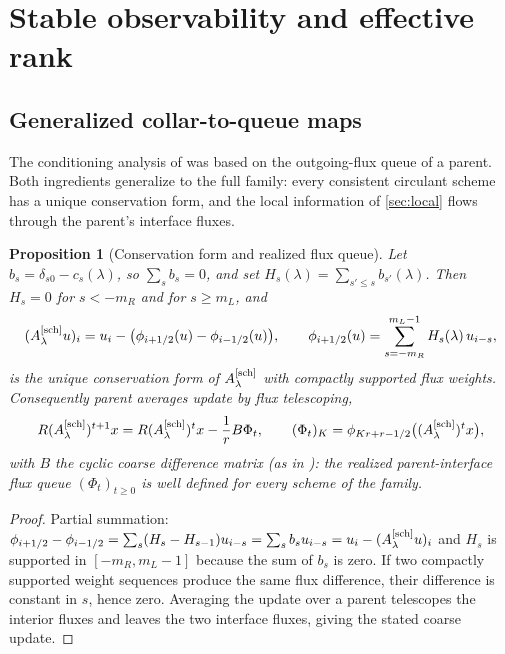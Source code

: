 \documentclass[pdflatex,sn-mathphys-num]{sn-jnl}%
\theoremstyle{thmstyleone}%
\newtheorem{proposition}{Proposition}%
\theoremstyle{thmstyletwo}%
\theoremstyle{thmstylethree}%
\newcommand{\Asch}{A^{[\rm sch]}_\lambda}
\begin{document}
\section{Stable observability and effective rank}\label{sec:conditioning}

\subsection{Generalized collar-to-queue maps}\label{sec:queue-maps}

The conditioning analysis of \cite{PolemitisChristakisDrikakis2026FVerasure} was based on the outgoing-flux queue of a parent.
Both ingredients generalize to the full family: every consistent circulant scheme has a unique conservation form, and the local information of \cref{sec:local} flows through the parent's interface fluxes.

\begin{proposition}[Conservation form and realized flux queue]\label{prop:flux-form}
Let $b_s=\delta_{s0}-c_s(\lambda)$, so $\sum_sb_s=0$, and set $H_s(\lambda)=\sum_{s'\le s}b_{s'}(\lambda)$.
Then $H_s=0$ for $s<-m_R$ and for $s\ge m_L$, and \[ (\Asch u)_i = u_i-\bigl(\phi_{i+1/2}(u)-\phi_{i-1/2}(u)\bigr), \qquad \phi_{i+1/2}(u)=\sum_{s=-m_R}^{m_L-1}H_s(\lambda)\,u_{i-s}, \] is the unique conservation form of $\Asch$ with compactly supported flux weights.
Consequently parent averages update by flux telescoping, \[ R(\Asch)^{t+1}x = R(\Asch)^{t}x-\frac1rB\Phi_t, \qquad (\Phi_t)_K=\phi_{Kr+r-1/2}\bigl((\Asch)^tx\bigr), \] with $B$ the cyclic coarse difference matrix (as in \cite{PolemitisChristakisDrikakis2026FVerasure}): the \emph{realized parent-interface flux queue} $(\Phi_t)_{t\ge0}$ is well defined for every scheme of the family.
\end{proposition}

\begin{proof}
Partial summation: $\phi_{i+1/2}-\phi_{i-1/2} =\sum_s(H_s-H_{s-1})u_{i-s}=\sum_sb_su_{i-s}=u_i-(\Asch u)_i$ and $H_s$ is supported in $[-m_R,m_L-1]$ because the sum of $b_s$ is zero.
If two compactly supported weight sequences produce the same flux difference, their difference is constant in $s$, hence zero.
Averaging the update over a parent telescopes the interior fluxes and leaves the two interface fluxes, giving the stated coarse update.
\end{proof}
\end{document}
